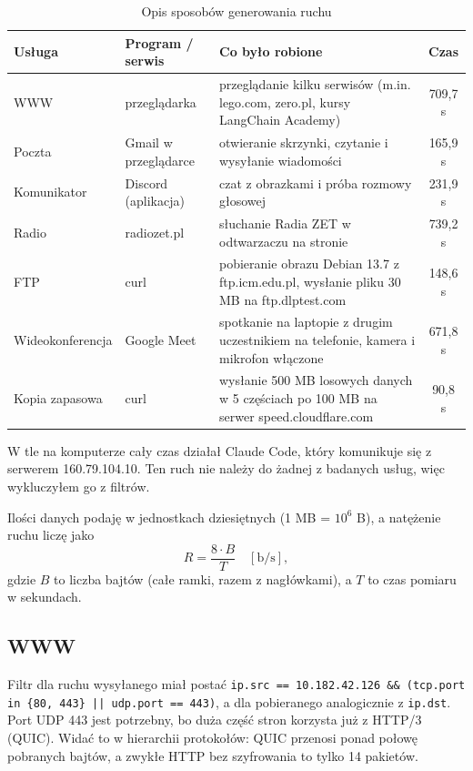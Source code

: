 \documentclass[12pt,a4paper]{article}
\begin{document}
\begin{table}[H]\centering
\begin{tabular}{>{\raggedright}p{2.6cm}>{\raggedright}p{3.2cm}>{\raggedright\arraybackslash}p{6.2cm}c}
\toprule
Usługa & Program / serwis & Co było robione & Czas \\
\midrule
WWW & przeglądarka & przeglądanie kilku serwisów (m.in. lego.com, zero.pl, kursy LangChain Academy) & 709,7 s \\
Poczta & Gmail w przeglądarce & otwieranie skrzynki, czytanie i wysyłanie wiadomości & 165,9 s \\
Komunikator & Discord (aplikacja) & czat z obrazkami i próba rozmowy głosowej & 231,9 s \\
Radio & radiozet.pl & słuchanie Radia ZET w odtwarzaczu na stronie & 739,2 s \\
FTP & curl & pobieranie obrazu Debian 13.7 z ftp.icm.edu.pl, wysłanie pliku 30 MB na ftp.dlptest.com & 148,6 s \\
Wideo\-kon\-fe\-ren\-cja & Google Meet & spotkanie na laptopie z drugim uczestnikiem na telefonie, kamera i mikrofon włączone & 671,8 s \\
Kopia zapasowa & curl & wysłanie 500 MB losowych danych w 5 częściach po 100 MB na serwer speed.\-cloudflare.\-com & 90,8 s \\
\bottomrule
\end{tabular}
\caption{Opis sposobów generowania ruchu}
\end{table}

W tle na komputerze cały czas działał Claude Code, który komunikuje się z serwerem 160.79.104.10.
Ten ruch nie należy do żadnej z badanych usług, więc wykluczyłem go z filtrów.

Ilości danych podaję w jednostkach dziesiętnych (1 MB = $10^6$ B), a natężenie ruchu liczę jako
\[
R = \frac{8 \cdot B}{T} \quad [\text{b/s}],
\]
gdzie $B$ to liczba bajtów (całe ramki, razem z nagłówkami), a $T$ to czas pomiaru w sekundach.

\subsection{WWW}

Filtr dla ruchu wysyłanego miał postać
\texttt{ip.src == 10.182.42.126 \&\& (tcp.port in \{80, 443\} || udp.port == 443)},
a dla pobieranego analogicznie z \texttt{ip.dst}. Port UDP 443 jest potrzebny, bo duża część
stron korzysta już z HTTP/3 (QUIC). Widać to w hierarchii protokołów: QUIC przenosi ponad połowę
pobranych bajtów, a zwykłe HTTP bez szyfrowania to tylko 14 pakietów.
\end{document}
